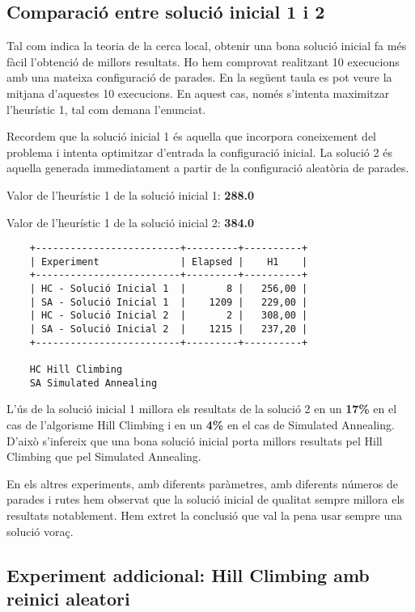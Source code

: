 
\subsection{Comparació entre solució inicial 1 i 2}
Tal com indica la teoria de la cerca local, obtenir una bona solució inicial fa més fàcil l'obtenció de millors resultats. Ho hem comprovat realitzant 10 execucions amb una mateixa configuració de parades. En la següent taula es pot veure la mitjana d'aquestes 10 execucions. En aquest cas, només s'intenta maximitzar l'heurístic 1, tal com demana l'enunciat.

Recordem que la solució inicial 1 és aquella que incorpora coneixement del problema i intenta optimitzar d'entrada la configuració inicial. La solució 2 és aquella generada immediatament a partir de la configuració aleatòria de parades.

Valor de l'heurístic 1 de la solució inicial 1: \textbf{288.0}

Valor de l'heurístic 1 de la solució inicial 2: \textbf{384.0}

\begin{verbatim}
	+-------------------------+---------+----------+
	| Experiment              | Elapsed |    H1    |
	+-------------------------+---------+----------+
	| HC - Solució Inicial 1  |       8 |   256,00 |
	| SA - Solució Inicial 1  |    1209 |   229,00 |
	| HC - Solució Inicial 2  |       2 |   308,00 |
	| SA - Solució Inicial 2  |    1215 |   237,20 |
	+-------------------------+---------+----------+
	
	HC Hill Climbing
	SA Simulated Annealing
\end{verbatim}
		
L'ús de la solució inicial 1 millora els resultats de la solució 2 en un \textbf{17\%} en el cas de l'algorisme Hill Climbing i en un \textbf{4\%} en el cas de Simulated Annealing. D'això s'infereix que una bona solució inicial porta millors resultats pel Hill Climbing que pel Simulated Annealing. 

En els altres experiments, amb diferents paràmetres, amb diferents números de parades i rutes hem observat que la solució inicial de qualitat sempre millora els resultats notablement. Hem extret la conclusió que val la pena usar sempre una solució voraç. 

\subsection{Experiment addicional: Hill Climbing amb reinici aleatori}

